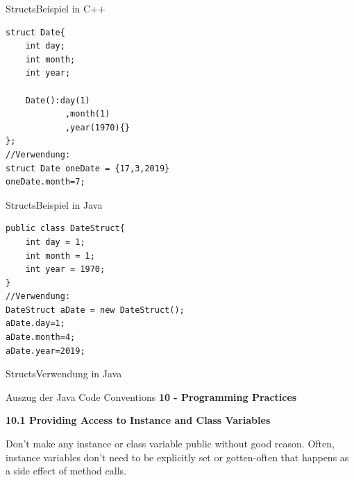 \begin{frame}[fragile]{Structs}{Beispiel in C++}
\lstset{style=cpp}
\begin{lstlisting}
struct Date{
    int day;
    int month;
    int year;
    
    Date():day(1)
            ,month(1)
            ,year(1970){}
};
//Verwendung:
struct Date oneDate = {17,3,2019}
oneDate.month=7;
\end{lstlisting}
\end{frame}

\begin{frame}[fragile]{Structs}{Beispiel in Java}
\lstset{style=java}
\begin{lstlisting}
public class DateStruct{
    int day = 1;
    int month = 1;
    int year = 1970;
}
//Verwendung:
DateStruct aDate = new DateStruct();
aDate.day=1;
aDate.month=4;
aDate.year=2019;
\end{lstlisting}
\end{frame}

\begin{frame}{Structs}{Verwendung in Java}
    \begin{alertblock}{Auszug der Java Code Conventions}
    \textbf{10 - Programming Practices}
    
    \textbf{10.1 Providing Access to Instance and Class Variables}
    
    Don't make any instance or class variable public without good reason. Often, instance variables don't need to be explicitly set or gotten-often that happens as a side effect of method calls.
    
    \end{alertblock}
\end{frame}

